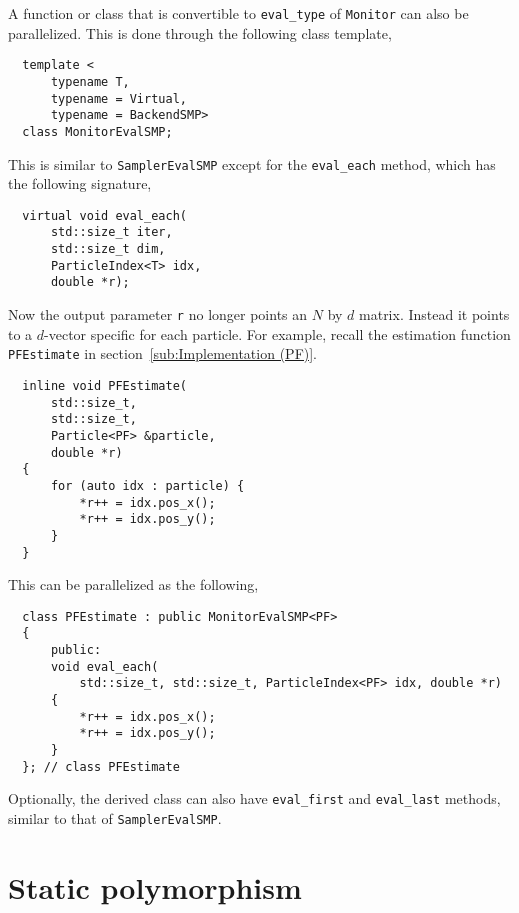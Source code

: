 A function or class that is convertible to \verb|eval_type| of \verb|Monitor|
can also be parallelized. This is done through the following class template,
\begin{Verbatim}
  template <
      typename T,
      typename = Virtual,
      typename = BackendSMP>
  class MonitorEvalSMP;
\end{Verbatim}
This is similar to \verb|SamplerEvalSMP| except for the \verb|eval_each|
method, which has the following signature,
\begin{Verbatim}
  virtual void eval_each(
      std::size_t iter,
      std::size_t dim,
      ParticleIndex<T> idx,
      double *r);
\end{Verbatim}
Now the output parameter \verb|r| no longer points an $N$ by $d$ matrix.
Instead it points to a $d$-vector specific for each particle. For example,
recall the estimation function \verb|PFEstimate| in
section~\ref{sub:Implementation (PF)}.
\begin{Verbatim}
  inline void PFEstimate(
      std::size_t,
      std::size_t,
      Particle<PF> &particle,
      double *r)
  {
      for (auto idx : particle) {
          *r++ = idx.pos_x();
          *r++ = idx.pos_y();
      }
  }
\end{Verbatim}
This can be parallelized as the following,
\begin{Verbatim}
  class PFEstimate : public MonitorEvalSMP<PF>
  {
      public:
      void eval_each(
          std::size_t, std::size_t, ParticleIndex<PF> idx, double *r)
      {
          *r++ = idx.pos_x();
          *r++ = idx.pos_y();
      }
  }; // class PFEstimate
\end{Verbatim}
Optionally, the derived class can also have \verb|eval_first| and
\verb|eval_last| methods, similar to that of \verb|SamplerEvalSMP|.

\section{Static polymorphism}
\label{sec:Static polymorphism}

